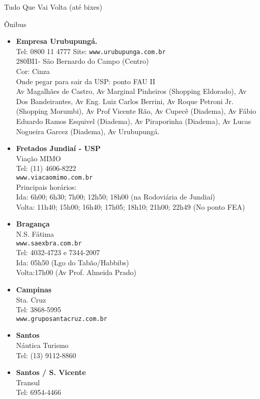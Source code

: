\begin{secao}{Tudo Que Vai Volta (até bixes)}
\begin{subsecao}{Ônibus}
\begin{itemize}
  \item {\bf Empresa Urubupungá.}\\
    Tel: 0800 11 4777
    Site: {\tt www.urubupunga.com.br}\\
    280BI1- São Bernardo do Campo (Centro)\\
    Cor: Cinza\\
    Onde pegar para sair da USP: ponto FAU II\\
    Av Magalhães de Castro, Av Marginal Pinheiros (Shopping Eldorado), Av Dos
    Bandeirantes, Av Eng. Luiz Carlos Berrini, Av Roque Petroni Jr. (Shopping
    Morumbi), Av Prof Vicente Rão, Av Cupecê (Diadema), Av Fábio Eduardo Ramos
    Esquivel (Diadema), Av Piraporinha (Diadema), Av Lucas Nogueira Garcez
    (Diadema), Av Urubupungá.

  \item {\bf Fretados Jundiaí - USP}\\
    Viação MIMO\\
    Tel: (11) 4606-8222\\
    {\tt www.viacaomimo.com.br}\\
    Principais horários:\\
    Ida: 6h00; 6h30; 7h00; 12h50; 18h00 (na Rodoviária de Jundiaí)\\
    Volta: 11h40; 15h00; 16h40; 17h05; 18h10; 21h00; 22h49 (No ponto FEA)

  \item {\bf Bragança}\\
    N.S. Fátima\\
    {\tt www.saexbra.com.br}\\
    Tel: 4032-4723 e 7344-2007\\
    Ida: 05h50 (Lgo do Tabão/Habbibs)\\
    Volta:17h00 (Av Prof. Almeida Prado)

  \item {\bf Campinas}\\
    Sta. Cruz\\
    Tel: 3868-5995\\
    {\tt www.gruposantacruz.com.br}

  \item {\bf Santos}\\
    Náutica Turismo\\
    Tel: (13) 9112-8860

  \item {\bf Santos / S. Vicente}\\
    Transul\\
    Tel: 6954-4466


\end{itemize}
\end{subsecao}
\end{secao}
